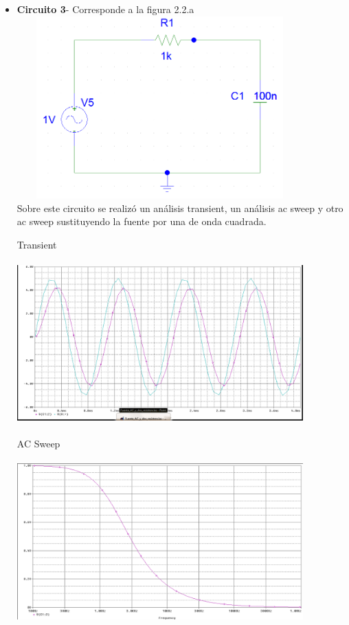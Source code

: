 \documentclass[12pt]{article}
\begin{document}
\begin{itemize}
		\item \textbf{Circuito 3}- Corresponde a la figura 2.2.a\\ 
		
		\includegraphics[width=11cm,height=7cm]{ac_rc}\\
		
		\noindent Sobre este circuito se realizó un análisis transient, un análisis ac sweep y otro ac sweep sustituyendo la fuente por una de onda cuadrada.
		
		\noindent Transient\\
		
		\includegraphics[width=11cm,height=7cm]{Fuente_AC_RC}\\
		
		\noindent AC Sweep\\
		
		\includegraphics[width=11cm,height=7cm]{Fuente_AC_RC_AC_sweep}\\
		

\end{itemize}
\end{document}
